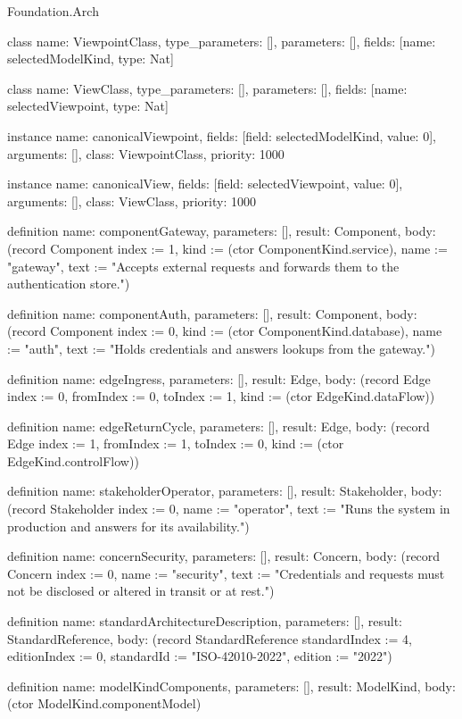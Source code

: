\begin{lexlean}{Foundation.Arch}
\begin{semanticmodule}
class{
  name: ViewpointClass,
  type_parameters: [],
  parameters: [],
  fields: [{name: selectedModelKind, type: Nat}]
}

class{
  name: ViewClass,
  type_parameters: [],
  parameters: [],
  fields: [{name: selectedViewpoint, type: Nat}]
}

instance{
  name: canonicalViewpoint,
  fields: [{field: selectedModelKind, value: 0}],
  arguments: [],
  class: ViewpointClass,
  priority: 1000
}

instance{
  name: canonicalView,
  fields: [{field: selectedViewpoint, value: 0}],
  arguments: [],
  class: ViewClass,
  priority: 1000
}

definition{
  name: componentGateway,
  parameters: [],
  result: Component,
  body: (record Component {index := 1, kind := (ctor ComponentKind.service), name := "gateway", text := "Accepts external requests and forwards them to the authentication store."})
}

definition{
  name: componentAuth,
  parameters: [],
  result: Component,
  body: (record Component {index := 0, kind := (ctor ComponentKind.database), name := "auth", text := "Holds credentials and answers lookups from the gateway."})
}

definition{
  name: edgeIngress,
  parameters: [],
  result: Edge,
  body: (record Edge {index := 0, fromIndex := 0, toIndex := 1, kind := (ctor EdgeKind.dataFlow)})
}

definition{
  name: edgeReturnCycle,
  parameters: [],
  result: Edge,
  body: (record Edge {index := 1, fromIndex := 1, toIndex := 0, kind := (ctor EdgeKind.controlFlow)})
}

definition{
  name: stakeholderOperator,
  parameters: [],
  result: Stakeholder,
  body: (record Stakeholder {index := 0, name := "operator", text := "Runs the system in production and answers for its availability."})
}

definition{
  name: concernSecurity,
  parameters: [],
  result: Concern,
  body: (record Concern {index := 0, name := "security", text := "Credentials and requests must not be disclosed or altered in transit or at rest."})
}

definition{
  name: standardArchitectureDescription,
  parameters: [],
  result: StandardReference,
  body: (record StandardReference {standardIndex := 4, editionIndex := 0, standardId := "ISO-42010-2022", edition := "2022"})
}

definition{
  name: modelKindComponents,
  parameters: [],
  result: ModelKind,
  body: (ctor ModelKind.componentModel)
}


\end{semanticmodule}
\end{lexlean}
